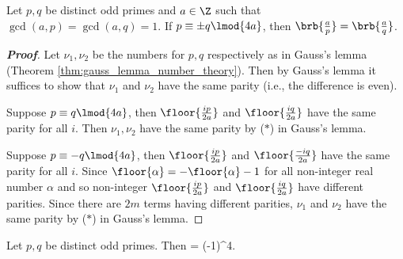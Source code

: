 \begin{lemma}\label{lem:distinct_odd_primes_pm_congruence_legendre_symbol}
Let $p,q$ be distinct odd primes and $a\in \Z$ such that $\gcd(a,p) = \gcd(a,q)=1$. If $p\equiv \pm q\lmod{4a}$, then $\brb{\frac ap} = \brb{\frac aq}$.
\end{lemma}

\begin{proof}[\bf Proof]
Let $\nu_1,\nu_2$ be the numbers for $p,q$ respectively as in Gauss's lemma (Theorem \ref{thm:gauss_lemma_number_theory}). Then by Gauss's lemma it suffices to show that $\nu_1$ and $\nu_2$ have the same parity (i.e., the difference is even).

Suppose $p\equiv q \lmod{4a}$, then $\floor{\frac{ip}{2a}}$ and $\floor{\frac{iq}{2a}}$ have the same parity for all $i$. Then $\nu_1,\nu_2$ have the same parity by ($*$) in Gauss's lemma.

Suppose $p\equiv -q\lmod{4a}$, then $\floor{\frac{ip}{2a}}$ and $\floor{\frac{-iq}{2a}}$ have the same parity for all $i$. Since $\floor{\alpha} = -\floor{\alpha}-1$ for all non-integer real number $\alpha$ and so non-integer $\floor{\frac{ip}{2a}}$ and $\floor{\frac{iq}{2a}}$ have different parities. Since there are $2m$ terms having different parities, $\nu_1$ and $\nu_2$ have the same parity by ($*$) in Gauss's lemma.
\end{proof}

\begin{theorem}\label{thm:law_of_quadratic_reciprocity_legendre_symbol}
Let $p,q$ be distinct odd primes. Then
\be
{}  = (-1)^{4}.
\ee
\end{theorem}

